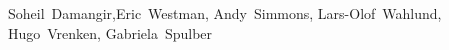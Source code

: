 Soheil~Damangir,Eric~Westman, Andy~Simmons, Lars-Olof~Wahlund, Hugo~Vrenken, Gabriela~Spulber
  
  
  
  
  
  
  
  
  
  
  